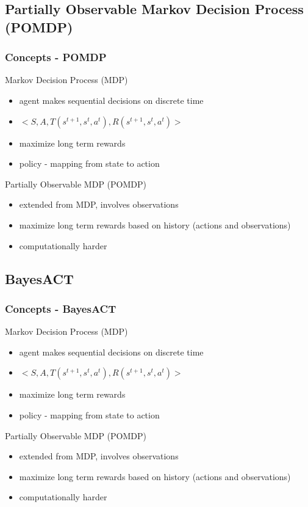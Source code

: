 \documentclass{beamer}
\begin{document}
\subsection{Partially Observable Markov Decision Process (POMDP)}
\begin{frame}
\frametitle{Concepts - POMDP}
Markov Decision Process (MDP)
\begin{itemize}
\item agent makes sequential decisions on discrete time
\item $<S, A, T(s^{t+1},s^t,a^t), R(s^{t+1},s^t,a^t)>$
\item maximize long term rewards
\item policy - mapping from state to action
\end{itemize}
\pause
Partially Observable MDP (POMDP)
\begin{itemize}
\item extended from MDP, involves observations
\item maximize long term rewards based on history (actions and observations)
\item computationally harder
\end{itemize}
\end{frame}


\subsection{BayesACT}
\begin{frame}
\frametitle{Concepts - BayesACT}
Markov Decision Process (MDP)
\begin{itemize}
\item agent makes sequential decisions on discrete time
\item $<S, A, T(s^{t+1},s^t,a^t), R(s^{t+1},s^t,a^t)>$
\item maximize long term rewards
\item policy - mapping from state to action
\end{itemize}
\pause
Partially Observable MDP (POMDP)
\begin{itemize}
\item extended from MDP, involves observations
\item maximize long term rewards based on history (actions and observations)
\item computationally harder
\end{itemize}
\end{frame}

\end{document}
